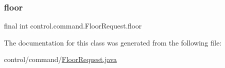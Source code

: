 \mbox{\label{classcontrol_1_1command_1_1_floor_request_a8cac00f900db9272c0e6971e0327075f}} 
\subsubsection{\texorpdfstring{floor}{floor}}
{\footnotesize\ttfamily final int control.\+command.\+Floor\+Request.\+floor\hspace{0.3cm}{\ttfamily [private]}}



The documentation for this class was generated from the following file\+:\begin{DoxyCompactItemize}
\item 
control/command/\mbox{\hyperlink{_floor_request_8java}{Floor\+Request.\+java}}\end{DoxyCompactItemize}
